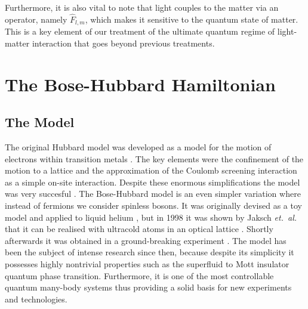 Furthermore, it is also vital to note that light couples to the matter
via an operator, namely $\hat{F}_{l,m}$, which makes it sensitive to
the quantum state of matter. This is a key element of our treatment of
the ultimate quantum regime of light-matter interaction that goes
beyond previous treatments.

\section{The Bose-Hubbard Hamiltonian}

\subsection{The Model}

The original Hubbard model was developed as a model for the motion of
electrons within transition metals \cite{hubbard1963}. The key
elements were the confinement of the motion to a lattice and the
approximation of the Coulomb screening interaction as a simple on-site
interaction. Despite these enormous simplifications the model was very
succesful \cite{leggett}. The Bose-Hubbard model is an even simpler
variation where instead of fermions we consider spinless bosons. It
was originally devised as a toy model and applied to liquid helium
\cite{fisher1989}, but in 1998 it was shown by Jaksch \emph{et.~al.}
that it can be realised with ultracold atoms in an optical lattice
\cite{jaksch1998}. Shortly afterwards it was obtained in a
ground-breaking experiment \cite{greiner2002}. The model has been the
subject of intense research since then, because despite its simplicity
it possesses highly nontrivial properties such as the superfluid to
Mott insulator quantum phase transition. Furthermore, it is one of the
most controllable quantum many-body systems thus providing a solid
basis for new experiments and technologies.

